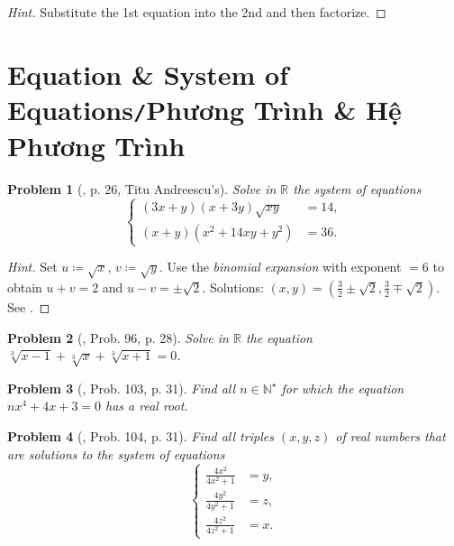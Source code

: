 \documentclass[oneside]{book}
\numberwithin{equation}{section}
\newtheorem{problem}{Problem}[section]
\begin{document}
\begin{proof}[Hint]
	Substitute the 1st equation into the 2nd and then factorize.
\end{proof}

\section{Equation \& System of Equations\texttt{/}Phương Trình \& Hệ Phương Trình}

\begin{problem}[\cite{Gelca_Andreescu2017}, p. 26, Titu Andreescu's]
	Solve in $\mathbb{R}$ the system of equations
	\begin{equation*}
		\left\{\begin{split}
			(3x + y)(x + 3y)\sqrt{xy} &= 14,\\
			(x + y)(x^2 + 14xy + y^2) &= 36.
		\end{split}\right.
	\end{equation*}
\end{problem}

\begin{proof}[Hint]
	Set $u\coloneqq\sqrt{x}$, $v\coloneqq\sqrt{y}$. Use the \textit{binomial expansion} with exponent $= 6$ to obtain $u + v = 2$ and $u - v = \pm\sqrt{2}$. Solutions: $(x,y) = \left(\frac{3}{2}\pm\sqrt{2},\frac{3}{2}\mp\sqrt{2}\right)$. See \cite[p. 26]{Gelca_Andreescu2017}.
\end{proof}

\begin{problem}[\cite{Gelca_Andreescu2017}, Prob. 96, p. 28]
	Solve in $\mathbb{R}$ the equation $\sqrt[3]{x - 1} + \sqrt[3]{x} + \sqrt[3]{x + 1} = 0$.
\end{problem}

\begin{problem}[\cite{Gelca_Andreescu2017}, Prob. 103, p. 31]
	Find all $n\in\mathbb{N}^\star$ for which the equation $nx^4 + 4x + 3 = 0$ has a real root.
\end{problem}

\begin{problem}[\cite{Gelca_Andreescu2017}, Prob. 104, p. 31]
	Find all triples $(x,y,z)$ of real numbers that are solutions to the system of equations
	\begin{equation*}
		\left\{\begin{split}
			\frac{4x^2}{4x^2 + 1} &= y,\\
			\frac{4y^2}{4y^2 + 1} &= z,\\
			\frac{4z^2}{4z^2 + 1} &= x.
		\end{split}\right.
	\end{equation*}
\end{problem}
\end{document}
